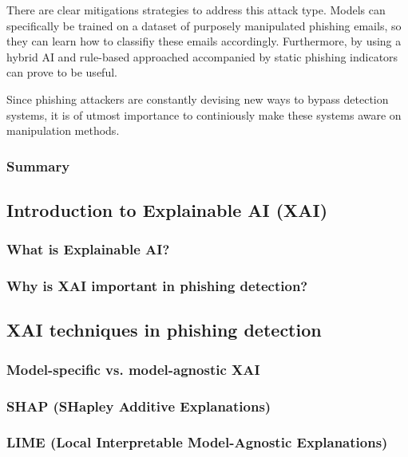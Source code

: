 \noindent There are clear mitigations strategies to address this attack type. Models can specifically be trained on a dataset of purposely manipulated phishing emails, so they can learn how to classifiy these emails accordingly. Furthermore, by using a hybrid AI and rule-based approached accompanied by static phishing indicators can prove to be useful.\newline

\noindent Since phishing attackers are constantly devising new ways to bypass detection systems, it is of utmost importance to continiously make these systems aware on manipulation methods.

\subsubsection*{Summary}

\newpage

\subsection*{Introduction to Explainable AI (XAI)}

\subsubsection*{What is Explainable AI?}

\subsubsection*{Why is XAI important in phishing detection?}

\newpage

\subsection*{XAI techniques in phishing detection}

\subsubsection*{Model-specific vs. model-agnostic XAI}

\subsubsection*{SHAP (SHapley Additive Explanations)}

\subsubsection*{LIME (Local Interpretable Model-Agnostic Explanations)}

